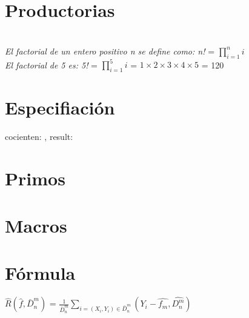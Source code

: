 \documentclass{article}
\begin{document}
\maketitle

\tableofcontents
\newpage


\section{Productorias}
\textit{}
\\
\textit{El factorial de un entero positivo n se define como: n!} = \(\prod_{i=1}^n i \)
\\ 
\textit{El factorial de 5 es: 5!} = \(\prod_{i=1}^5 i \) = \(1 \times 2 \times 3 \times 4 \times 5\) = 120



\section{Especifiaci\'on}

\begin{proc}{cociente}{\In n: \ent, \Out result: \ent}{}
    \end{proc}

\section{Primos}



\section{Macros}


\section{Fórmula}
\textit{\(\hat R (\hat f, \bar D^{m}_{n})\)} = \textit{\(\frac{1}{\bar D^{m}_{n}}\sum_{i = (X_{i}, Y_{i}) \in \bar D^{m}_{n}}(Y_{i} - \hat{f_{m}}, \hat{D^{m}_{n}})\)}
\end{document}
